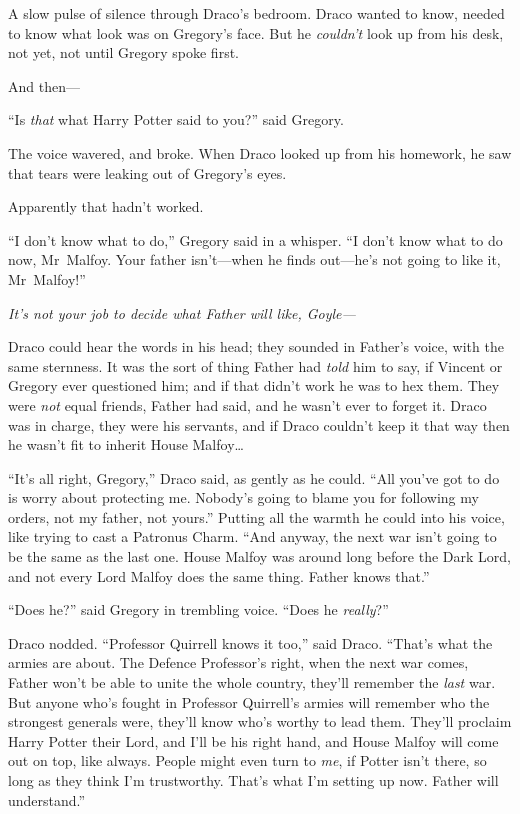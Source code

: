 A slow pulse of silence through Draco’s bedroom. Draco wanted to know, needed to know what look was on Gregory’s face. But he \emph{couldn’t} look up from his desk, not yet, not until Gregory spoke first.

And then—

“Is \emph{that} what Harry Potter said to you?” said Gregory.

The voice wavered, and broke. When Draco looked up from his homework, he saw that tears were leaking out of Gregory’s eyes.

Apparently that hadn’t worked.

“I don’t know what to do,” Gregory said in a whisper. “I don’t know what to do now, Mr~Malfoy. Your father isn’t—when he finds out—he’s not going to like it, Mr~Malfoy!”

\emph{It’s not \emph{your} job to decide what Father will like, Goyle—}

Draco could hear the words in his head; they sounded in Father’s voice, with the same sternness. It was the sort of thing Father had \emph{told} him to say, if Vincent or Gregory ever questioned him; and if that didn’t work he was to hex them. They were \emph{not} equal friends, Father had said, and he wasn’t ever to forget it. Draco was in charge, they were his servants, and if Draco couldn’t keep it that way then he wasn’t fit to inherit House Malfoy…

“It’s all right, Gregory,” Draco said, as gently as he could. “All you’ve got to do is worry about protecting me. Nobody’s going to blame you for following my orders, not my father, not yours.” Putting all the warmth he could into his voice, like trying to cast a Patronus Charm. “And anyway, the next war isn’t going to be the same as the last one. House Malfoy was around long before the Dark Lord, and not every Lord Malfoy does the same thing. Father knows that.”

“Does he?” said Gregory in trembling voice. “Does he \emph{really}?”

Draco nodded. “Professor Quirrell knows it too,” said Draco. “That’s what the armies are about. The Defence Professor’s right, when the next war comes, Father won’t be able to unite the whole country, they’ll remember the \emph{last} war. But anyone who’s fought in Professor Quirrell’s armies will remember who the strongest generals were, they’ll know who’s worthy to lead them. They’ll proclaim Harry Potter their Lord, and I’ll be his right hand, and House Malfoy will come out on top, like always. People might even turn to \emph{me}, if Potter isn’t there, so long as they think I’m trustworthy. That’s what I’m setting up now. Father will understand.”

